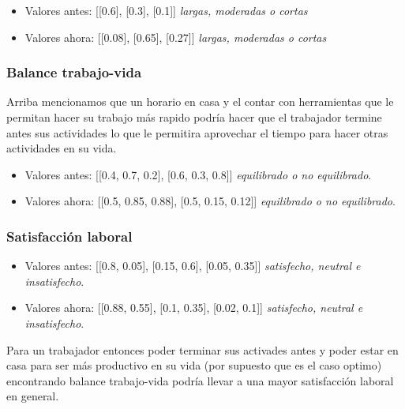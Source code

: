 \begin{itemize}
    \item Valores antes: [[0.6], [0.3], [0.1]] \textit{largas, moderadas o cortas}
    \item Valores ahora: [[0.08], [0.65], [0.27]] \textit{largas, moderadas o cortas}
\end{itemize}


\subsubsection*{Balance trabajo-vida}
Arriba mencionamos que un horario en casa y el contar con herramientas que le permitan hacer
su trabajo más rapido podría hacer que el trabajador termine antes sus actividades lo que 
le permitira aprovechar el tiempo para hacer otras actividades en su vida.

\begin{itemize}
    \item Valores antes: [[0.4, 0.7, 0.2], [0.6, 0.3, 0.8]] \textit{equilibrado o no equilibrado}.
    \item Valores ahora: [[0.5, 0.85, 0.88], [0.5, 0.15, 0.12]] \textit{equilibrado o no equilibrado}.
\end{itemize}

\subsubsection*{Satisfacción laboral}

\begin{itemize}
    \item Valores antes: [[0.8, 0.05], [0.15, 0.6], [0.05, 0.35]] \textit{satisfecho, neutral e insatisfecho}.
    \item Valores ahora: [[0.88, 0.55], [0.1, 0.35], [0.02, 0.1]] \textit{satisfecho, neutral e insatisfecho}.
\end{itemize}

Para un trabajador entonces poder terminar sus activades antes y poder estar en casa para ser 
más productivo en su vida (por supuesto que es el caso optimo) encontrando balance trabajo-vida podría 
llevar a una mayor satisfacción laboral en general.

